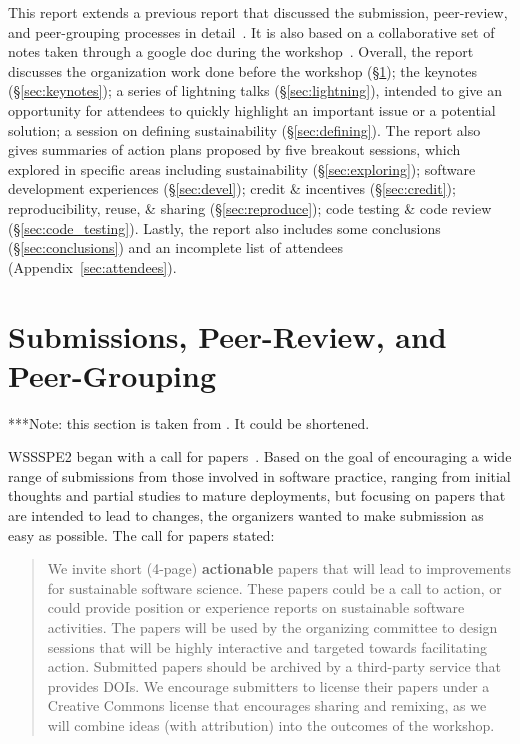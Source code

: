 \documentclass[11pt, oneside]{amsart}
\newcommand{\note}[1]{ {\textcolor{blueish}    { ***Note:      #1 }}}
\begin{document}
This report extends a previous report that discussed the submission,
peer-review, and peer-grouping processes in detail~\cite{WSSSPE2-pre-report}.
It is also based on a collaborative set of notes taken through a google doc
during the workshop~\cite{WSSSPE2-google-notes}. Overall, the report discusses
the organization work done before the workshop (\S\ref{sec:preworkshop}); the
keynotes (\S\ref{sec:keynotes}); a series of lightning talks
(\S\ref{sec:lightning}), intended to give an opportunity for attendees to
quickly highlight an important issue or a potential solution; a session on
defining sustainability (\S\ref{sec:defining}). The report also gives summaries
of action plans proposed by five breakout sessions, which explored in specific
areas including sustainability (\S\ref{sec:exploring}); software development
experiences (\S\ref{sec:devel}); credit \& incentives (\S\ref{sec:credit});
reproducibility, reuse, \& sharing (\S\ref{sec:reproduce}); code testing \& code
review (\S\ref{sec:code_testing}). Lastly, the report also includes some
conclusions (\S\ref{sec:conclusions}) and an incomplete list of attendees
(Appendix~\ref{sec:attendees}).

 

\section{Submissions, Peer-Review, and Peer-Grouping} \label{sec:preworkshop}

\note{this section is taken from \cite{WSSSPE2-pre-report}. It could be shortened.}

WSSSPE2 began with a call for papers~\cite{WSSSPE2-pre-report}. Based on the
goal of encouraging a wide range of submissions from those involved in software
practice, ranging from initial thoughts and partial studies to mature
deployments, but focusing on papers that are intended to lead to changes, the
organizers wanted to make submission as easy as possible. The call for papers
stated:

\begin{quote} We invite short (4-page) \textbf{actionable} papers that will lead
to improvements for sustainable software science. These papers could be a call
to action, or could provide position or experience reports on sustainable
software activities. The papers will be used by the organizing committee to
design sessions that will be highly interactive and targeted towards
facilitating action. Submitted papers should be archived by a third-party
service that provides DOIs. We encourage submitters to license their papers
under a Creative Commons license that encourages sharing and remixing, as we
will combine ideas (with attribution) into the outcomes of the workshop.
\end{quote}
\end{document}
